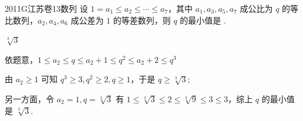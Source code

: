
\begin{problem}{2011}{G}{江苏卷}{13}{数列}
设 $1=a_1 \leqslant a_2 \leqslant \cdots \leqslant a_7$，其中 $a_1, a_3, a_5, a_7$ 成公比为 $q$ 的等比数列，$a_2, a_4, a_6$ 成公差为 $1$ 的等差数列，则 $q$ 的最小值是 \underline{\hspace{4em}}.
\end{problem}

\begin{answer}
$\sqrt[3]{3}$
\end{answer}

\begin{solutions}
依题意，$1 \leqslant a_2 \leqslant q \leqslant a_2+1 \leqslant q^2 \leqslant a_2+2 \leqslant q^3$

由 $a_2 \geqslant 1$ 可知 $q^3 \geqslant 3, q^2 \geqslant 2, q \geqslant 1$，于是 $q \geqslant \sqrt[3]{3}$;

另一方面，令 $a_2=1, q=\sqrt[3]{3}$ 有 $1 \leqslant \sqrt[3]{3} \leqslant 2 \leqslant \sqrt[3]{9} \leqslant 3 \leqslant 3$，综上 $q$ 的最小值是 $\sqrt[3]{3}$.
\end{solutions}